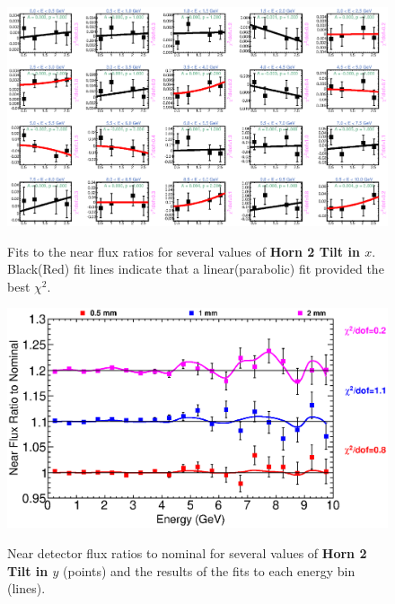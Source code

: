 \begin{figure}[ht]
  \begin{center}
    {\includegraphics[width=5.0in]{figures/Horn2XTilt_near_fits.eps}}
  \end{center}
\caption{ Fits to the near flux ratios for several values of {\bf Horn 2 Tilt in $x$}. Black(Red) fit lines indicate that a linear(parabolic) fit provided the best $\chi^2$. }
\end{figure}

\begin{figure}[ht]
  \begin{center}
    {\includegraphics[width=6.0in]{figures/Horn2YTilt_near_summary.eps}}
  \end{center}
\caption{ Near detector flux ratios to nominal for several values of {\bf Horn 2 Tilt in $y$} (points) and the results of the fits to each energy bin (lines).}
\end{figure}

